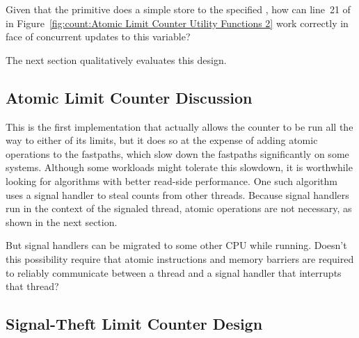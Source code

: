 \QuickQuiz{}
	Given that the  primitive does a simple
	store to the specified , how can line~21 of
	 in
	Figure~\ref{fig:count:Atomic Limit Counter Utility Functions 2}
	work correctly in face of concurrent 
	updates to this variable?
 \QuickQuizEnd

The next section qualitatively evaluates this design.

\subsection{Atomic Limit Counter Discussion}

This is the first implementation that actually allows the counter to
be run all the way to either of its limits, but it does so at the
expense of adding atomic operations to the fastpaths, which slow down
the fastpaths significantly on some systems.
Although some workloads might tolerate this slowdown, it is worthwhile
looking for algorithms with better read-side performance.
One such algorithm uses a signal handler to steal counts from other
threads.
Because signal handlers run in the context of the signaled thread,
atomic operations are not necessary, as shown in the next section.

\QuickQuiz{}
	But signal handlers can be migrated to some other
	CPU while running.
	Doesn't this possibility require that atomic instructions
	and memory barriers are required to reliably communicate
	between a thread and a signal handler that interrupts that
	thread?
 \QuickQuizEnd

\subsection{Signal-Theft Limit Counter Design}
\label{sec:count:Signal-Theft Limit Counter Design}

